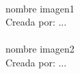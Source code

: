 \vspace*{\fill}
\baselineskip
{\textbf{\Large{}}}\\
nombre imagen1\\
Creada por: ...\\
\baselineskip
{\textbf{\Large{}}}\\
nombre imagen2\\
Creada por: ...\\

